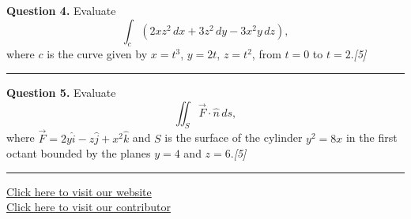 \documentclass[11pt,a4paper]{article}
\newcommand{\pts}[1]{\hfill   \textit{[#1]}}
\begin{document}
\noindent   \textbf{Question 4.} Evaluate
\[
  \int_{c} (2xz^2 \, dx + 3z^2 \, dy - 3x^2 y \, dz),
\]
where $c$ is the curve given by $x = t^3$, $y = 2t$, $z = t^2$, from $t = 0$ to $t = 2$.\pts{5}

\medskip\rule{\linewidth}{0.2pt}\medskip




\noindent   \textbf{Question 5.} Evaluate
\[
  \iint_{S} \vec{F} \cdot \hat{n} \, ds,
\]
where $\vec{F} = 2y\hat{i} - z\hat{j} + x^2\hat{k}$ and $S$ is the surface of the cylinder $y^2 = 8x$ in the first octant bounded by the planes $y = 4$ and $z = 6$.\pts{5}

\vfill
\rule{\linewidth}{0.4pt}

\begin{center}\small
\href{https://bhu-exam.vercel.app/}{Click here to visit our website}\\[4pt]
\href{https://me-aryan.vercel.app/}{Click here to visit our contributor}
\end{center}
\end{document}
